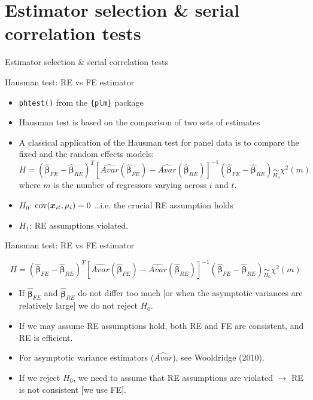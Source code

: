 \documentclass{beamer}
\begin{document}
\section{Estimator selection \& serial correlation tests}
\begin{frame}{Estimator selection \& serial correlation tests}
\end{frame}
\begin{frame}{Hausman test: RE vs FE estimator}
\begin{itemize}
    \item \texttt{phtest()} from the \texttt{\{plm\}} package
    \medskip
    \item Hausman test is based on the comparison of two sets of estimates
    \medskip
    \item A classical application of the Hausman test for panel data is to compare the fixed and the random effects models:
    {\small $$H=(\hat{\bm{\beta}}_{FE} - \hat{\bm{\beta}}_{RE})^T [\widehat{\textit{Avar}}(\hat{\bm{\beta}}_{FE}) - \widehat{\textit{Avar}}(\hat{\bm{\beta}}_{RE})]^{-1} (\hat{\bm{\beta}}_{FE} - \hat{\bm{\beta}}_{RE}) \underset{H_0}{\sim} \chi^2(m)$$}
    {\footnotesize where $m$ is the number of regressors varying across $i$ and $t$.}
    \smallskip
    \item[] $H_0$: $\textnormal{cov}(\bm{x}_{it},\mu_i) = 0$ \dots i.e. the crucial RE assumption holds
    \item[] $H_1$: RE assumptions violated.
\end{itemize}
\end{frame}
\begin{frame}{Hausman test: RE vs FE estimator}

{\small $$H=(\hat{\bm{\beta}}_{FE} - \hat{\bm{\beta}}_{RE})^T [\widehat{\textit{Avar}}(\hat{\bm{\beta}}_{FE}) - \widehat{\textit{Avar}}(\hat{\bm{\beta}}_{RE})]^{-1} (\hat{\bm{\beta}}_{FE} - \hat{\bm{\beta}}_{RE}) \underset{H_0}{\sim} \chi^2(m)$$}
\medskip
\begin{itemize}
    \item If $\hat{\bm{\beta}}_{FE}$ and $\hat{\bm{\beta}}_{RE}$ do not differ too much [or when the asymptotic variances are relatively large] we do not reject $H_0$. 
    \medskip
    \item If we may assume RE assumptions hold, both RE and FE are consistent, and RE is efficient. 
    \medskip
    \item For asymptotic variance estimators ($\widehat{\textit{Avar}}$), see Wooldridge (2010). 
    \medskip
    \item If we reject $H_0$, we need to assume that RE assumptions are violated $\rightarrow$ RE is not consistent [we use FE].
\end{itemize}
\end{frame}
\end{document}
